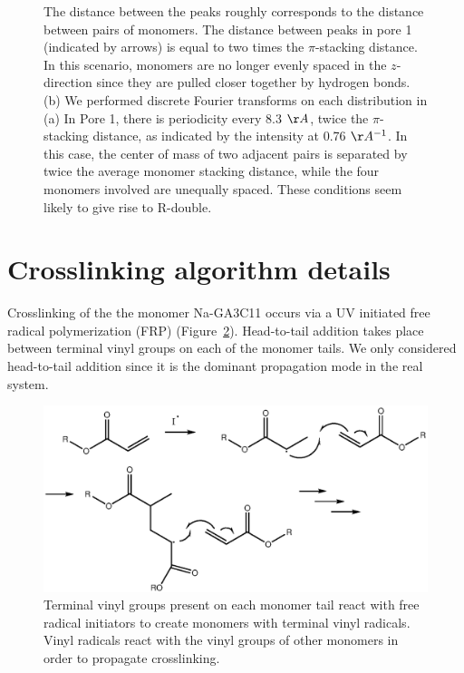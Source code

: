 \documentclass{article}
\begin{document}
\begin{figure}[!htb]
{  The distance between the peaks roughly corresponds to the distance between pairs of 
  monomers. The distance between peaks in pore 1 (indicated by arrows) is equal to two 
  times the $\pi$-stacking distance. In this scenario, monomers are no longer evenly spaced
  in the $z$-direction since they are pulled closer together by hydrogen bonds. (b) We 
  performed discrete Fourier transforms on each distribution in (a) In Pore 1, there 
  is periodicity every 8.3 $\AA$, twice the $\pi$-stacking distance, as indicated by the
  intensity at 0.76 $\AA^{-1}$. In this case, the center of mass of two adjacent pairs 
  is separated by twice the average monomer stacking distance, while the four monomers 
  involved are unequally spaced. These conditions seem likely to give rise to R-double.
  }\label{fig:hbonds}
  \end{figure}

  \section{Crosslinking algorithm details}\label{section:xlink}

  Crosslinking of the the monomer Na-GA3C11 occurs via a UV initiated free
  radical polymerization (FRP) (Figure~\ref{fig:xlink_mech}). Head-to-tail addition
  takes place between terminal vinyl groups on each of the monomer tails. We
  only considered head-to-tail addition since it is the dominant propagation mode
  in the real system.   

  \begin{figure}[!htb]
  \centering
  \includegraphics[width=\textwidth]{Crosslink_mechanism.eps}
  \caption{Terminal vinyl groups present on each monomer tail react with free
	  radical initiators to create monomers with terminal vinyl radicals.  Vinyl
	  radicals react with the vinyl groups of other monomers in order to propagate
	  crosslinking.}\label{fig:xlink_mech}
  \end{figure}
  
\end{document}
